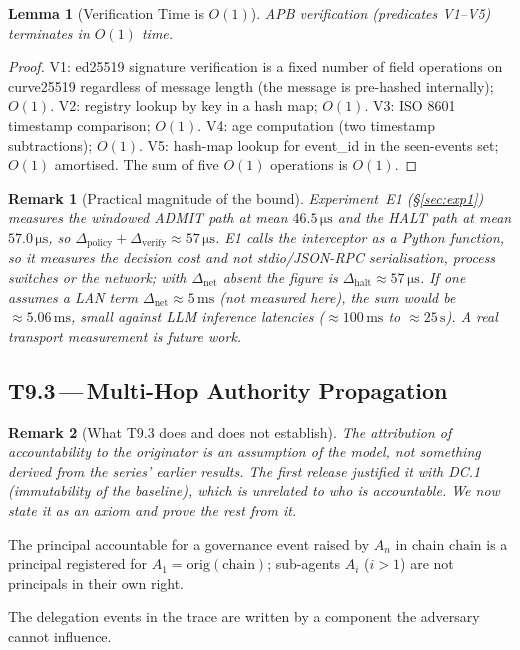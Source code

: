 \documentclass[11pt]{article}
\newtheorem{lemma}[theorem]{Lemma}
\newtheorem{remark}{Remark}[section]
\newcommand{\chain}{\mathrm{chain}}
\newcommand{\orig}{\mathrm{orig}}
\newcommand{\Dnet}{\Delta_{\mathrm{net}}}
\newcommand{\Dverify}{\Delta_{\mathrm{verify}}}
\newcommand{\Dpolicy}{\Delta_{\mathrm{policy}}}
\begin{document}
\begin{lemma}[Verification Time is $O(1)$]
\label{lem:l921}
APB verification (predicates V1--V5) terminates in $O(1)$ time.
\end{lemma}

\begin{proof}
V1: ed25519 signature verification is a fixed number of field
operations on curve25519 regardless of message length (the message
is pre-hashed internally); $O(1)$.
V2: registry lookup by key in a hash map; $O(1)$.
V3: ISO 8601 timestamp comparison; $O(1)$.
V4: age computation (two timestamp subtractions); $O(1)$.
V5: hash-map lookup for event\_id in the seen-events set; $O(1)$ amortised.
The sum of five $O(1)$ operations is $O(1)$.
\end{proof}

\begin{remark}[Practical magnitude of the bound]
Experiment~E1 (\S\ref{sec:exp1}) measures the windowed ADMIT path at
mean $46.5\,\si{\micro\second}$ and the HALT path at mean
$57.0\,\si{\micro\second}$, so $\Dpolicy + \Dverify \approx 57\,\si{\micro\second}$.
E1 calls the interceptor as a Python function, so it measures the
\emph{decision} cost and not stdio/JSON-RPC serialisation, process
switches or the network; with $\Dnet$ absent the figure is
$\Delta_\text{halt} \approx 57\,\si{\micro\second}$. If one
\emph{assumes} a LAN term $\Dnet \approx 5\,\si{\milli\second}$ (not measured here),
the sum would be $\approx 5.06\,\si{\milli\second}$, small against LLM
inference latencies ($\approx 100\,\si{\milli\second}$ to $\approx 25\,\si{\second}$).
A real transport measurement is future work.
\end{remark}

\subsection{T9.3\,---\,Multi-Hop Authority Propagation}
\label{sec:t93}

\begin{remark}[What T9.3 does and does not establish]
The attribution of accountability to the originator is an
\emph{assumption of the model}, not something derived from the series'
earlier results. The first release justified it with DC.1 (immutability
of the baseline), which is unrelated to who is accountable. We now state
it as an axiom and prove the rest from it.
\end{remark}

\begin{description}[leftmargin=2em, topsep=2pt]
  \item[AX9.1 (Attribution to the originator).]
        The principal accountable for a governance event raised by
        $A_n$ in chain $\chain$ is a principal registered for
        $A_1 = \orig(\chain)$; sub-agents $A_i$ ($i>1$) are not
        principals in their own right.
  \item[AX9.2 (Trusted chain record).]
        The delegation events in the trace are written by a component
        the adversary cannot influence.
\end{description}
\end{document}
